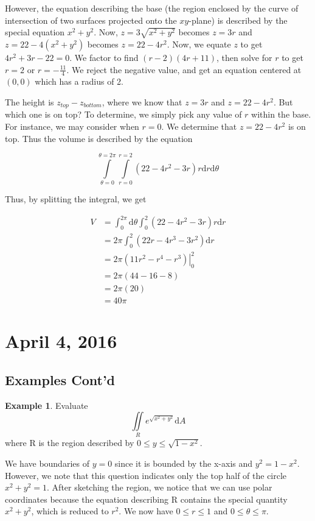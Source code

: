 \documentclass[11pt]{article}
\theoremstyle{plain} %
\theoremstyle{definition}
\theoremstyle{example}
\newtheorem*{example}{Example}
\theoremstyle{remark}
\begin{document}
However, the equation describing the base (the region enclosed by the curve of intersection of two surfaces projected onto the $xy$-plane) is described by the special equation $x^2+y^2$. Now, $z=3\sqrt{x^2+y^2}$ becomes $z= 3r$ and $z=22-4(x^2+y^2)$ becomes $z=22-4r^2$. Now, we equate $z$ to get $4r^2+3r-22=0$. We factor to find $(r-2)(4r+11)$, then solve for $r$ to get $r=2$ or $r=-\frac{11}{4}$. We reject the negative value, and get an equation centered at $(0,0)$ which has a radius of 2.

The height is $z_{top}-z_{bottom}$, where we know that $z=3r$ and $z=22-4r^2$. But which one is on top? To determine, we simply pick any value of $r$ within the base. For instance, we may consider when $r=0$. We determine that $z= 22-4r^2$ is on top. Thus the volume is described by the equation

$$\int \limits_{\theta = 0}^{\theta = 2 \pi}   \int \limits_{r = 0}^{r=2} (22-4r^2-3r) r \mathrm d r \mathrm d \theta$$

Thus, by splitting the integral, we get

\begin{align*}
	V &= \int_0^{2 \pi} \mathrm d \theta \int_0^2 \left(22-4r^2-3r\right)r \mathrm d r \\
	&= 2\pi\int_0^2 \left(22r-4r^3-3r^2\right)\mathrm d r\\
	&= 2\pi \left.\left(11r^2-r^4-r^3\right)\right|_0^2\\
	&= 2\pi (44-16-8)\\
	&= 2\pi(20)\\
	&= 40 \pi
\end{align*}





\section{April 4, 2016}
\subsection{Examples Cont'd}

\begin{example}
Evaluate $$\iint \limits_R e^{\sqrt{x^2+y^2}}\mathrm d A$$ where R is the region described by $0 \leq y \leq \sqrt{1-x^2}$.
\end{example}

We have boundaries of $y=0$ since it is bounded by the x-axis and $y^2 = 1-x^2$. However, we note that this question indicates only the top half of the circle $x^2 + y^2 = 1$. After sketching the region, we notice that we can use polar coordinates because the equation describing R contains the special quantity $x^2 + y^2$, which is reduced to $r^2$. We now have $0 \leq r \leq 1$ and $0 \leq \theta \leq \pi$. 
\end{document}

